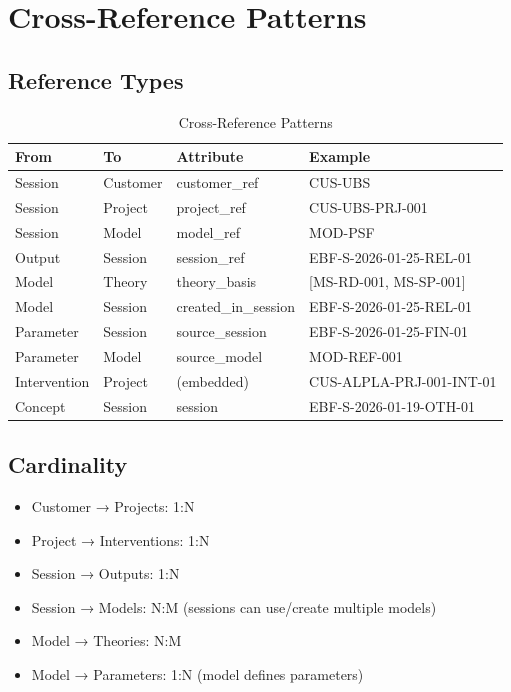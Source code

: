 \section{Cross-Reference Patterns}
\label{sec:superkey-crossref}

\subsection{Reference Types}

\begin{table}[htbp]
\centering
\caption{Cross-Reference Patterns}
\label{tab:crossref-patterns}
\renewcommand{\arraystretch}{1.3}
\begin{tabular}{@{}lllp{4cm}@{}}
\toprule
\textbf{From} & \textbf{To} & \textbf{Attribute} & \textbf{Example} \\
\midrule
Session & Customer & customer\_ref & CUS-UBS \\
Session & Project & project\_ref & CUS-UBS-PRJ-001 \\
Session & Model & model\_ref & MOD-PSF \\
Output & Session & session\_ref & EBF-S-2026-01-25-REL-01 \\
Model & Theory & theory\_basis & [MS-RD-001, MS-SP-001] \\
Model & Session & created\_in\_session & EBF-S-2026-01-25-REL-01 \\
Parameter & Session & source\_session & EBF-S-2026-01-25-FIN-01 \\
Parameter & Model & source\_model & MOD-REF-001 \\
Intervention & Project & (embedded) & CUS-ALPLA-PRJ-001-INT-01 \\
Concept & Session & session & EBF-S-2026-01-19-OTH-01 \\
\bottomrule
\end{tabular}
\end{table}

\subsection{Cardinality}

\begin{itemize}
    \item Customer → Projects: 1:N
    \item Project → Interventions: 1:N
    \item Session → Outputs: 1:N
    \item Session → Models: N:M (sessions can use/create multiple models)
    \item Model → Theories: N:M
    \item Model → Parameters: 1:N (model defines parameters)
\end{itemize}


